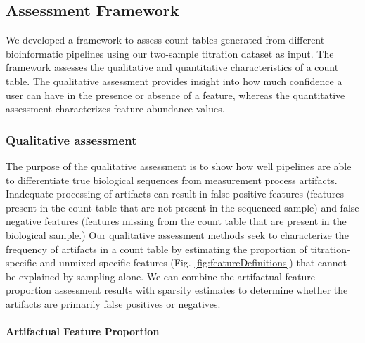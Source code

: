 \documentclass[linenumbers]{bmcart}
\begin{document}
\subsection*{Assessment Framework}
We developed a framework to assess count tables generated from different bioinformatic pipelines using our two-sample titration dataset as input.
The framework assesses the qualitative and quantitative characteristics of a count table.
The qualitative assessment provides insight into how much confidence a user can have in the presence or absence of a feature, whereas the quantitative assessment characterizes feature abundance values.

\subsubsection*{Qualitative assessment}
The purpose of the qualitative assessment is to show how well pipelines are able to differentiate true biological sequences from measurement process artifacts.
Inadequate processing of artifacts can result in false positive features (features present in the count table that are not present in the sequenced sample) and false negative features (features missing from the count table that are present in the biological sample.)
Our qualitative assessment methods seek to characterize the frequency of artifacts in a count table by estimating the proportion of titration-specific and unmixed-specific features (Fig. \ref{fig:featureDefinitions}) that cannot be explained by sampling alone.
We can combine the artifactual feature proportion assessment results with sparsity estimates to determine whether the artifacts are primarily false positives or negatives.

\paragraph{Artifactual Feature Proportion}
\end{document}
